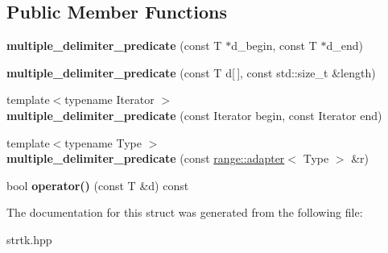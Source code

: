 \subsection*{Public Member Functions}
\begin{DoxyCompactItemize}
\item 
\hypertarget{structstrtk_1_1multiple__delimiter__predicate_abd62516a0d3ca46cbd209635cb0e4947}{{\bfseries multiple\-\_\-delimiter\-\_\-predicate} (const T $\ast$d\-\_\-begin, const T $\ast$d\-\_\-end)}\label{structstrtk_1_1multiple__delimiter__predicate_abd62516a0d3ca46cbd209635cb0e4947}

\item 
\hypertarget{structstrtk_1_1multiple__delimiter__predicate_a675f0597a53567f11e86a7a56c1b5697}{{\bfseries multiple\-\_\-delimiter\-\_\-predicate} (const T d\mbox{[}$\,$\mbox{]}, const std\-::size\-\_\-t \&length)}\label{structstrtk_1_1multiple__delimiter__predicate_a675f0597a53567f11e86a7a56c1b5697}

\item 
\hypertarget{structstrtk_1_1multiple__delimiter__predicate_a124afad80327733e3245fd0c5b2016e1}{{\footnotesize template$<$typename Iterator $>$ }\\{\bfseries multiple\-\_\-delimiter\-\_\-predicate} (const Iterator begin, const Iterator end)}\label{structstrtk_1_1multiple__delimiter__predicate_a124afad80327733e3245fd0c5b2016e1}

\item 
\hypertarget{structstrtk_1_1multiple__delimiter__predicate_ad0a809ad2e33b992cfa84785ae2fed4f}{{\footnotesize template$<$typename Type $>$ }\\{\bfseries multiple\-\_\-delimiter\-\_\-predicate} (const \hyperlink{classstrtk_1_1range_1_1adapter}{range\-::adapter}$<$ Type $>$ \&r)}\label{structstrtk_1_1multiple__delimiter__predicate_ad0a809ad2e33b992cfa84785ae2fed4f}

\item 
\hypertarget{structstrtk_1_1multiple__delimiter__predicate_af18033cefb0481b0957ecc49390cf08c}{bool {\bfseries operator()} (const T \&d) const }\label{structstrtk_1_1multiple__delimiter__predicate_af18033cefb0481b0957ecc49390cf08c}

\end{DoxyCompactItemize}


The documentation for this struct was generated from the following file\-:\begin{DoxyCompactItemize}
\item 
strtk.\-hpp\end{DoxyCompactItemize}
